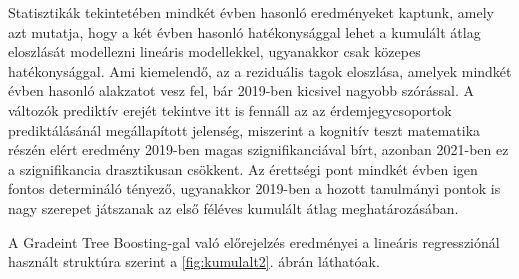 \documentclass[12pt]{article}
\begin{document}
\noindent Statisztikák tekintetében mindkét évben hasonló eredményeket kaptunk, amely azt mutatja, hogy a két évben hasonló hatékonysággal lehet a kumulált átlag eloszlását modellezni lineáris modellekkel, ugyanakkor csak közepes hatékonysággal. Ami kiemelendő, az a reziduális tagok eloszlása, amelyek mindkét évben hasonló alakzatot vesz fel, bár 2019-ben kicsivel nagyobb szórással. A változók prediktív erejét tekintve itt is fennáll az az érdemjegycsoportok prediktálásánál megállapított jelenség, miszerint a kognitív teszt matematika részén elért eredmény 2019-ben magas szignifikanciával bírt, azonban 2021-ben ez a szignifikancia drasztikusan csökkent. Az érettségi pont mindkét évben igen fontos determináló tényező, ugyanakkor 2019-ben a hozott tanulmányi pontok is nagy szerepet játszanak az első féléves kumulált átlag meghatározásában.

A Gradeint Tree Boosting-gal való előrejelzés eredményei a lineáris regressziónál használt struktúra szerint a \ref{fig:kumulalt2}. ábrán láthatóak. 
\end{document}

